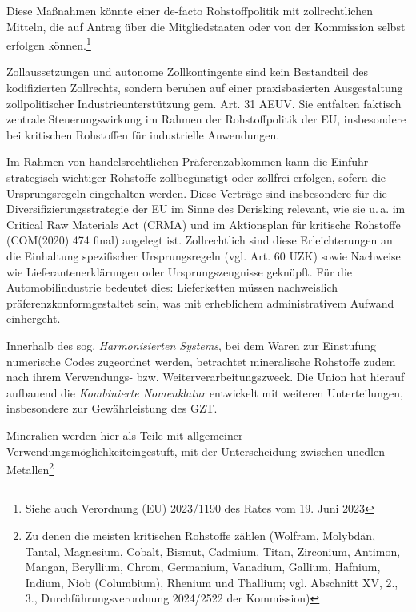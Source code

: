 \documentclass[12pt,a4paper,oneside]{book} %
\begin{document}
Diese Maßnahmen könnte einer de-facto Rohstoffpolitik mit zollrechtlichen Mitteln, die auf Antrag über die Mitgliedstaaten oder von der Kommission selbst erfolgen können.\footnote{Siehe auch Verordnung (EU) 2023/1190 des Rates vom 19. Juni 2023}

Zollaussetzungen und autonome Zollkontingente sind kein Bestandteil des kodifizierten Zollrechts, sondern beruhen auf einer praxisbasierten Ausgestaltung zollpolitischer Industrieunterstützung gem. Art. 31 AEUV. Sie entfalten faktisch zentrale Steuerungswirkung im Rahmen der Rohstoffpolitik der EU, insbesondere bei kritischen Rohstoffen für industrielle Anwendungen.


Im Rahmen von handelsrechtlichen Präferenzabkommen kann die Einfuhr strategisch wichtiger Rohstoffe zollbegünstigt oder zollfrei erfolgen, sofern die Ursprungsregeln eingehalten werden. Diese Verträge sind insbesondere für die Diversifizierungsstrategie der EU im Sinne des Derisking relevant, wie sie u. a. im Critical Raw Materials Act (CRMA) und im Aktionsplan für kritische Rohstoffe (COM(2020) 474 final) angelegt ist. Zollrechtlich sind diese Erleichterungen an die Einhaltung spezifischer Ursprungsregeln (vgl. Art. 60 UZK) sowie Nachweise wie Lieferantenerklärungen oder Ursprungszeugnisse geknüpft. Für die Automobilindustrie bedeutet dies: Lieferketten müssen nachweislich \glqq präferenzkonform\grqq gestaltet sein, was mit erheblichem administrativem Aufwand einhergeht.

Innerhalb des sog. \textit{Harmonisierten Systems}, bei dem Waren zur Einstufung numerische Codes zugeordnet werden, betrachtet mineralische Rohstoffe zudem nach ihrem Verwendungs- bzw. Weiterverarbeitungszweck. Die Union hat hierauf aufbauend die \textit{Kombinierte Nomenklatur} entwickelt mit weiteren Unterteilungen, insbesondere zur Gewährleistung des GZT. 



Mineralien werden hier als \glqq Teile mit allgemeiner Verwendungsmöglichkeit\grqq eingestuft, mit der Unterscheidung zwischen \glqq unedlen Metallen\grqq\footnote{Zu denen die meisten kritischen Rohstoffe zählen (Wolfram, Molybdän, Tantal, Magnesium, Cobalt, Bismut, Cadmium, Titan, Zirconium, Antimon, Mangan, Beryllium, Chrom, Germanium, Vanadium, Gallium, Hafnium, Indium, Niob (Columbium), Rhenium und Thallium; vgl. Abschnitt XV, 2., 3., Durchführungsverordnung 2024/2522 der Kommission)}
\end{document}
